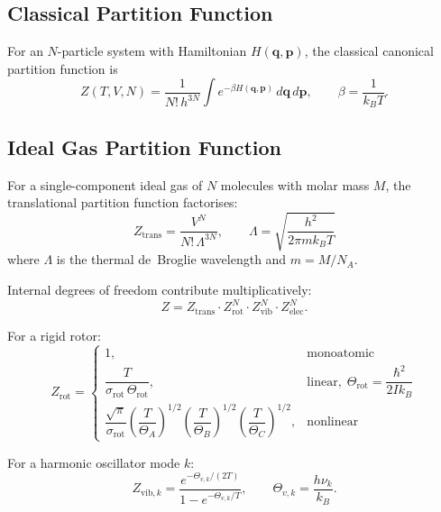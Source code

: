 \documentclass[11pt]{article}
\begin{document}
\subsection{Classical Partition Function}

For an $N$-particle system with Hamiltonian $H(\mathbf{q},\mathbf{p})$,
the classical canonical partition function is
\begin{equation}
  Z(T,V,N) = \frac{1}{N!\,h^{3N}}
    \int e^{-\beta H(\mathbf{q},\mathbf{p})}\,d\mathbf{q}\,d\mathbf{p},
    \qquad \beta = \frac{1}{k_B T}.
  \label{eq:partition_function}
\end{equation}

\subsection{Ideal Gas Partition Function}

For a single-component ideal gas of $N$ molecules with molar mass $M$,
the translational partition function factorises:
\begin{equation}
  Z_\mathrm{trans} = \frac{V^N}{N!\,\Lambda^{3N}},
  \qquad
  \Lambda = \sqrt{\frac{h^2}{2\pi m k_B T}}
  \label{eq:thermal_wavelength}
\end{equation}
where $\Lambda$ is the thermal de~Broglie wavelength and $m = M/N_A$.

Internal degrees of freedom contribute multiplicatively:
\begin{equation}
  Z = Z_\mathrm{trans} \cdot Z_\mathrm{rot}^N \cdot Z_\mathrm{vib}^N
      \cdot Z_\mathrm{elec}^N.
\end{equation}

For a rigid rotor:
\begin{equation}
  Z_\mathrm{rot} =
  \begin{cases}
    1, & \text{monoatomic} \\
    \dfrac{T}{\sigma_\mathrm{rot}\,\Theta_\mathrm{rot}}, &
      \text{linear},\;\Theta_\mathrm{rot} = \dfrac{\hbar^2}{2Ik_B} \\[6pt]
    \dfrac{\sqrt{\pi}}{\sigma_\mathrm{rot}}
      \left(\dfrac{T}{\Theta_A}\right)^{1/2}
      \left(\dfrac{T}{\Theta_B}\right)^{1/2}
      \left(\dfrac{T}{\Theta_C}\right)^{1/2}, &
      \text{nonlinear}
  \end{cases}
\end{equation}

For a harmonic oscillator mode $k$:
\begin{equation}
  Z_{\mathrm{vib},k} = \frac{e^{-\Theta_{v,k}/(2T)}}{1 - e^{-\Theta_{v,k}/T}},
  \qquad \Theta_{v,k} = \frac{h\nu_k}{k_B}.
\end{equation}
\end{document}
